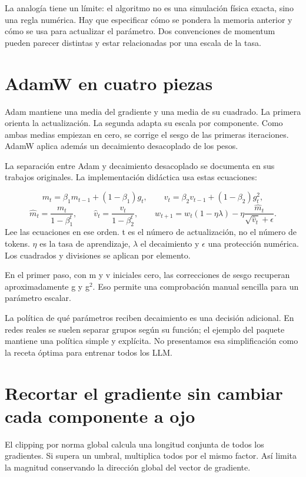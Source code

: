 \documentclass[12pt,a4paper,oneside]{report}
\begin{document}
La analogía tiene un límite: el algoritmo no es una simulación física exacta, sino una regla numérica. Hay que especificar cómo se pondera la memoria anterior y cómo se usa para actualizar el parámetro. Dos convenciones de momentum pueden parecer distintas y estar relacionadas por una escala de la tasa.

\section{AdamW en cuatro piezas}
Adam mantiene una media del gradiente y una media de su cuadrado. La primera orienta la actualización. La segunda adapta su escala por componente. Como ambas medias empiezan en cero, se corrige el sesgo de las primeras iteraciones. AdamW aplica además un decaimiento desacoplado de los pesos.

La separación entre Adam y decaimiento desacoplado se documenta en sus trabajos originales. \cite{adam,adamw} La implementación didáctica usa estas ecuaciones:

\[
m_t=\beta_1m_{t-1}+(1-\beta_1)g_t,\qquad
v_t=\beta_2v_{t-1}+(1-\beta_2)g_t^2,
\]
\[
\widehat m_t=\frac{m_t}{1-\beta_1^t},\qquad
\widehat v_t=\frac{v_t}{1-\beta_2^t},\qquad
w_{t+1}=w_t(1-\eta\lambda)-\eta\frac{\widehat m_t}{\sqrt{\widehat v_t}+\epsilon}.
\]
Lee las ecuaciones en ese orden. t es el número de actualización, no el número de tokens. $\eta$ es la tasa de aprendizaje, $\lambda$ el decaimiento y $\epsilon$ una protección numérica. Los cuadrados y divisiones se aplican por elemento.

En el primer paso, con m y v iniciales cero, las correcciones de sesgo recuperan aproximadamente g y g\ensuremath{^2}. Eso permite una comprobación manual sencilla para un parámetro escalar.

La política de qué parámetros reciben decaimiento es una decisión adicional. En redes reales se suelen separar grupos según su función; el ejemplo del paquete mantiene una política simple y explícita. No presentamos esa simplificación como la receta óptima para entrenar todos los LLM.

\section{Recortar el gradiente sin cambiar cada componente a ojo}
El clipping por norma global calcula una longitud conjunta de todos los gradientes. Si supera un umbral, multiplica todos por el mismo factor. Así limita la magnitud conservando la dirección global del vector de gradiente.
\end{document}
